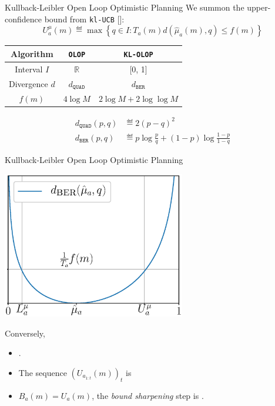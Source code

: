 \documentclass{beamer}
\begin{document}
\begin{frame}{Kullback-Leibler Open Loop Optimistic Planning}
    We summon the upper-confidence bound from \texttt{kl-UCB} [\cite{Cappe2013}]:
    \begin{equation*}
        U^{\mu}_a(m) \eqdef \max \left\{q\in I: T_a(m) d(\hat{\mu}_a(m), q) \leq f(m) \right\}
    \end{equation*}
    
    \begin{center}
    \begin{tabular}{ccc}
    \toprule
        Algorithm & \texttt{OLOP} & \texttt{KL-OLOP} \\
        \midrule
        Interval $I$ & $\mathbb{R}$ & [0, 1] \\
        Divergence $d$ & $d_{\texttt{QUAD}}$ & $d_{\texttt{BER}}$ \\
        $f(m)$ & $4 \log M$ & $2\log M + 2 \log\log M$\\
        \bottomrule
    \end{tabular}
    \end{center}
    
    \begin{align*}
    d_{\texttt{QUAD}}(p,q) &\eqdef 2(p-q)^2\\
    d_{\texttt{BER}}(p, q) &\eqdef p \log \frac{p}{q} + (1-p)\log\frac{1-p}{1-q}
    \end{align*}
    
\end{frame}

\begin{frame}{Kullback-Leibler Open Loop Optimistic Planning}
\begin{center}
\vspace{-2em}
    \includegraphics[width=0.6\textwidth]{../img/ukl}
\end{center}
\vspace{-1em}
Conversely,
\begin{itemize}
    \item {}. 
    \item The sequence $(U_{a_{1:t}}(m))_t$ is 
    \item $B_a(m) = U_a(m)$, the \emph{bound sharpening} step is .
\end{itemize}
\end{frame}
\end{document}
